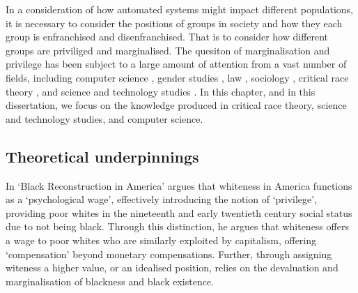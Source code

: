 In a consideration of how automated systems might impact different populations, it is necessary to consider the positions of groups in society and how they each group is enfranchised and disenfranchised. That is to consider how different groups are priviliged and marginalised. The quesiton of marginalisation and privilege has been subject to a large amount of attention from a vast number of fields, including computer science \citep{CITE: Some FACCT papers}, gender studies \citep{CITE: Gender studies papers,Mohanty:1989}, law \citep{Crenshaw:1989}, sociology \citep{CITE: Sociology papers}, critical race theory \citep{Benjamin:2019,Myers:2019}, and science and technology studies \citep{Haraway:1988}. In this chapter, and in this dissertation, we focus on the knowledge produced in critical race theory, science and technology studies, and computer science.\vspace{5mm}

\subsection{Theoretical underpinnings}

In `Black Reconstruction in America' \cite{Dubois:1935} argues that whiteness in America functions as a `psychological wage', effectively introducing the notion of `privilege', providing poor whites in the nineteenth and early twentieth century social status due to not being black. Through this distinction, he argues that whiteness offers a wage to poor whites who are similarly exploited by capitalism, offering `compensation' beyond monetary compensations. Further, through assigning witeness a higher value, or an idealised position, relies on the devaluation and marginalisation of blackness and black existence.



